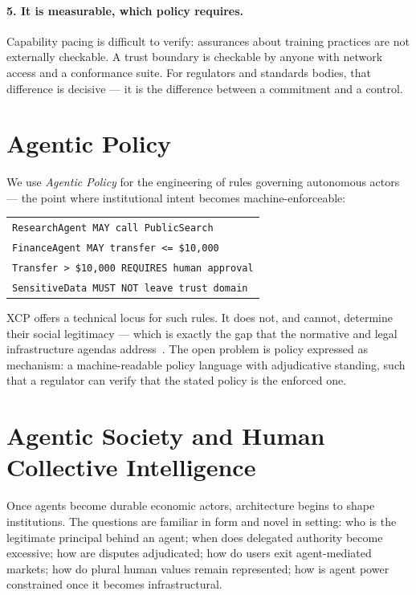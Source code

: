 \documentclass[11pt]{article}
\begin{document}
\paragraph{5. It is measurable, which policy requires.}
Capability pacing is difficult to verify: assurances about training practices are
not externally checkable. A trust boundary is checkable by anyone with network
access and a conformance suite. For regulators and standards bodies, that
difference is decisive --- it is the difference between a commitment and a
control.

\section{Agentic Policy}

We use \emph{Agentic Policy} for the engineering of rules governing autonomous
actors --- the point where institutional intent becomes machine-enforceable:

\begin{center}
\small
\begin{tabular}{@{}l@{}}
\toprule
\texttt{ResearchAgent MAY call PublicSearch} \\
\texttt{FinanceAgent MAY transfer <= \$10,000} \\
\texttt{Transfer > \$10,000 REQUIRES human approval} \\
\texttt{SensitiveData MUST NOT leave trust domain} \\
\bottomrule
\end{tabular}
\end{center}

XCP offers a technical locus for such rules. It does not, and cannot, determine
their social legitimacy --- which is exactly the gap that the normative and legal
infrastructure agendas address~\cite{pattison2026,chaffer2026}. The open problem
is policy expressed as mechanism: a machine-readable policy language with
adjudicative standing, such that a regulator can verify that the stated policy is
the enforced one.

\section{Agentic Society and Human Collective Intelligence}

Once agents become durable economic actors, architecture begins to shape
institutions. The questions are familiar in form and novel in setting: who is the
legitimate principal behind an agent; when does delegated authority become
excessive; how are disputes adjudicated; how do users exit agent-mediated
markets; how do plural human values remain represented; how is agent power
constrained once it becomes infrastructural.
\end{document}

